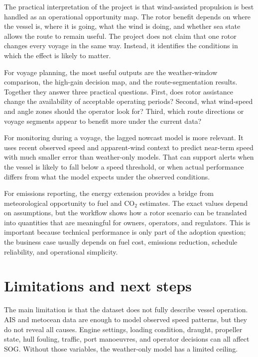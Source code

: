 \documentclass[10pt,a4paper]{article}
\newcommand{\co}{CO$_2$}
\newcommand{\sog}{SOG}
\begin{document}
The practical interpretation of the project is that wind-assisted propulsion is
best handled as an operational opportunity map. The rotor benefit depends on
where the vessel is, where it is going, what the wind is doing, and whether sea
state allows the route to remain useful. The project does not claim that one
rotor changes every voyage in the same way. Instead, it identifies the
conditions in which the effect is likely to matter.

For voyage planning, the most useful outputs are the weather-window comparison,
the high-gain decision map, and the route-segmentation results. Together they
answer three practical questions. First, does rotor assistance change the
availability of acceptable operating periods? Second, what wind-speed and angle
zones should the operator look for? Third, which route directions or voyage
segments appear to benefit more under the current data?

For monitoring during a voyage, the lagged nowcast model is more relevant. It
uses recent observed speed and apparent-wind context to predict near-term speed
with much smaller error than weather-only models. That can support alerts when
the vessel is likely to fall below a speed threshold, or when actual performance
differs from what the model expects under the observed conditions.

For emissions reporting, the energy extension provides a bridge from
meteorological opportunity to fuel and \co{} estimates. The exact values depend
on assumptions, but the workflow shows how a rotor scenario can be translated
into quantities that are meaningful for owners, operators, and regulators. This
is important because technical performance is only part of the adoption
question; the business case usually depends on fuel cost, emissions reduction,
schedule reliability, and operational simplicity.

\section{Limitations and next steps}

The main limitation is that the dataset does not fully describe vessel
operation. AIS and metocean data are enough to model observed speed patterns,
but they do not reveal all causes. Engine settings, loading condition, draught,
propeller state, hull fouling, traffic, port manoeuvres, and operator decisions
can all affect \sog{}. Without those variables, the weather-only model has a
limited ceiling.
\end{document}
